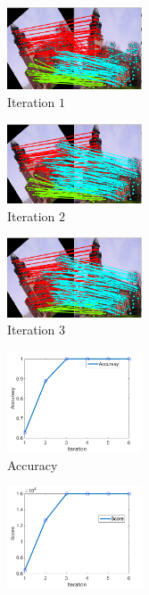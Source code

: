 \begin{figure} 
	\begin{center}
		\begin{subfigure}[t]{0.32\textwidth}
			\includegraphics[width=4cm]{"chapter3/fig/ImageTrafo/sIterations/It1"} 
			\caption{Iteration $1$}
		\end{subfigure}
		\begin{subfigure}[t]{0.32\textwidth}
			\includegraphics[width=4cm]{"chapter3/fig/ImageTrafo/sIterations/It2"} 
			\caption{Iteration $2$}
		\end{subfigure} 
		\begin{subfigure}[t]{0.32\textwidth}
			\includegraphics[width=4cm]{"chapter3/fig/ImageTrafo/sIterations/It3"}
			\caption{Iteration $3$}
		\end{subfigure} 	
		\begin{subfigure}[t]{0.33\textwidth}
			\includegraphics[width=4cm]{"chapter3/fig/ImageTrafo/sIterations/accuracy"}
			\caption{Accuracy\hspace{5pt}}
			\label{fig:ImageTrafo_sIterations_d}
		\end{subfigure} 
		\begin{subfigure}[t]{0.33\textwidth}
			\includegraphics[width=4cm]{"chapter3/fig/ImageTrafo/sIterations/score"}

\end{subfigure}
\end{center}
\end{figure}

